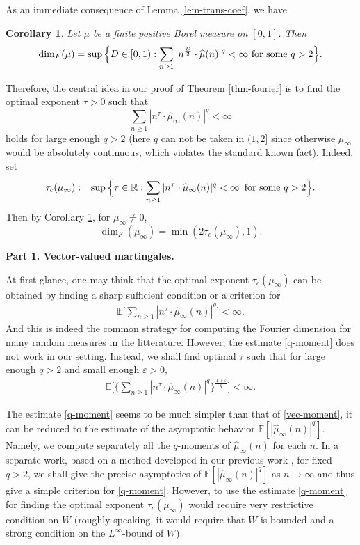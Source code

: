 \documentclass[12pt]{amsart}
\newtheorem{corollary}[theorem]{Corollary}
\theoremstyle{definition}
\theoremstyle{remark}
\newcommand{\R}{\mathbb{R}}
\newcommand{\E}{\mathbb{E}}
\numberwithin{equation}{section}
\begin{document}
As an immediate consequence of Lemma \ref{lem-trans-coef}, we have 

\begin{corollary}\label{cor-series-dim}
Let $\mu$ be a finite positive Borel  measure on $[0,1]$.  Then 
\[
\dim_F(\mu)= \sup \Big\{D \in [0,1):    \text{$  \sum_{n\ge 1 } | n^{\frac{D}{2}}  \cdot \widehat{\mu}(n)|^q <\infty$ for some $q>2$}    \Big\}. 
\]
\end{corollary}


Therefore,  the central idea   in our proof of Theorem \ref{thm-fourier} is to find the optimal exponent $\tau>0$ such that 
\[
\sum_{n\ge 1} | n^{\tau}  \cdot \widehat{\mu}_\infty(n)|^q<\infty
\]
holds for large enough $q>2$ (here $q$ can not be taken in $(1, 2]$ since otherwise $\mu_\infty$ would be absolutely continuous, which violates the standard known fact).  Indeed,  set
\begin{align}\label{def-tau-c}
\tau_c(\mu_\infty): =  \sup \Big\{\tau \in \R: \sum_{n\ge 1} | n^{\tau}  \cdot \widehat{\mu}_\infty(n)|^q<\infty \text{\, for some $q>2$} \Big\}. 
\end{align}
Then by Corollary \ref{cor-series-dim},  for  $\mu_\infty\ne 0$, 
\[
\dim_F(\mu_\infty) = \min( 2 \tau_c(\mu_\infty), 1).
\]



 


{\flushleft \bf    Part 1.  Vector-valued martingales.} 


  At first glance, one may think that the optimal exponent $\tau_c(\mu_\infty)$ can be obtained by finding a  sharp sufficient condition or a  criterion for 
\begin{align}\label{q-moment}
\E\Big[ \sum_{n\ge 1} | n^{\tau}  \cdot \widehat{\mu}_\infty(n)|^q\Big]<\infty. 
\end{align}
And  this is indeed the common strategy for computing the Fourier dimension for  many random measures in the litterature.  However, the estimate \eqref{q-moment} does not work in our setting. Instead,  we shall find optimal $\tau$ such that for large enough $q>2$ and small enough $\varepsilon> 0$, 
\begin{align}\label{vec-moment}
\E\Big[\Big\{ \sum_{n\ge 1} | n^{\tau}  \cdot \widehat{\mu}_\infty(n)|^q\Big\}^{\frac{1+\varepsilon}{q}} \Big]<\infty.
\end{align}



The estimate \eqref{q-moment} seems to be  much simpler than that of \eqref{vec-moment}, it can be  reduced to the estimate of the asymptotic behavior $\E[|\widehat{\mu}_\infty(n)|^q]$.  Namely, we compute separately all the $q$-moments of $\widehat{\mu}_\infty(n)$ for each $n$.  In a separate work,  based on a method developed in our previous work \cite{HQW-23},  for fixed $q>2$, we shall give  the precise asymptotics of $\E[|\widehat{\mu}_\infty(n)|^q]$  as $n\to\infty$ and thus give a simple criterion for \eqref{q-moment}.  However,  to use the estimate \eqref{q-moment} for finding the optimal exponent $\tau_c(\mu_\infty)$ would require  very restrictive condition on $W$ (roughly speaking, it would require that  $W$ is bounded and a strong condition on the $L^\infty$-bound of $W$). 
\end{document}

